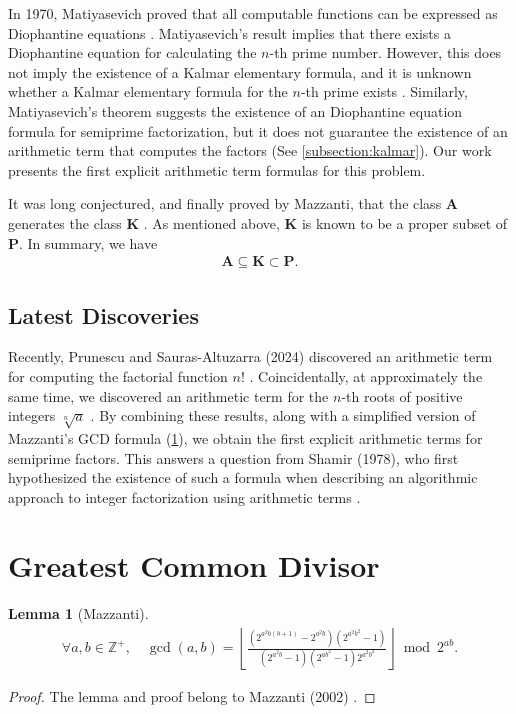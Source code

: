 \documentclass[11pt,reqno]{article}
\theoremstyle{plain}
\newtheorem{lemma}[theorem]{Lemma}
\theoremstyle{definition}
\newcommand{\floor}[1]{\left\lfloor #1 \right\rfloor}
\newcommand{\Z}{\mathbb{Z}}
\begin{document}
In 1970, Matiyasevich proved that all computable functions can be expressed as Diophantine equations \cite{matiyasevich1980diophantine, matiyasevich1993hilbert}. Matiyasevich's result implies that there exists a Diophantine equation for calculating the $n$-th prime number. However, this does not imply the existence of a Kalmar elementary formula, and it is unknown whether a Kalmar elementary formula for the $n$-th prime exists \cite{prunescu2024factorial}. Similarly, Matiyasevich's theorem suggests the existence of an Diophantine equation formula for semiprime factorization, but it does not guarantee the existence of an arithmetic term that computes the factors (See \cref{subsection:kalmar}). Our work presents the first explicit arithmetic term formulas for this problem.

It was long conjectured, and finally proved by Mazzanti, that the class $\textbf{A}$ generates the class $\textbf{K}$ \cite{mazzanti2002plainbases, marchenkov2007superposition}. As mentioned above, $\textbf{K}$ is known to be a proper subset of $\textbf{P}$. In summary, we have
\begin{align*}
    \textbf{A} \subseteq \textbf{K} \subset \textbf{P} .
\end{align*}

\subsection{Latest Discoveries}

Recently, Prunescu and Sauras-Altuzarra (2024) discovered an arithmetic term for computing the factorial function $n!$ \cite{prunescu2024factorial}. Coincidentally, at approximately the same time, we discovered an arithmetic term for the $n$-th roots of positive integers $\sqrt[n]{a}$ \cite{shunia2024polynomial}. By combining these results, along with a simplified version of Mazzanti's GCD formula (\cref{proof:mazzantigcd}), we obtain the first explicit arithmetic terms for semiprime factors. This answers a question from Shamir (1978), who first hypothesized the existence of such a formula when describing an algorithmic approach to integer factorization using arithmetic terms \cite{shamir1978factoring}.

\section{Greatest Common Divisor} \label{section:gcd}

\begin{lemma}[Mazzanti] \label{proof:mazzantigcd}
\begin{align*}
\forall a,b \in \Z^+, \quad
\gcd(a,b) = \floor{\frac{(2^{a^2 b(b+1)} - 2^{a^2 b}) (2^{a^2 b^2} - 1)}
         {(2^{a^2 b} - 1)(2^{ab^2}-1)2^{a^2 b^2}}} \bmod 2^{ab}.
\end{align*}
\end{lemma}
\begin{proof}
The lemma and proof belong to Mazzanti (2002) \cite{mazzanti2002plainbases}.
\end{proof}
\end{document}
